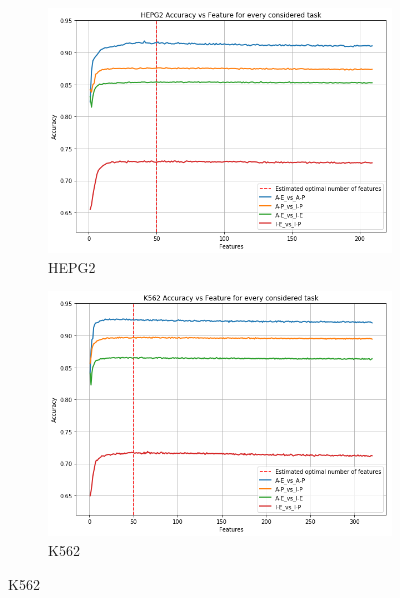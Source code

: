 \begin{figure}[!htb]
    \begin{subfigure}[b]{0.45\textwidth}
        \includegraphics[width=\textwidth]{images/features_plots_accuracy/HEPG2_n_features.png}
        \caption{HEPG2}
        \label{fig:HEPG2_n_feat}
    \end{subfigure}
    \begin{subfigure}[b]{0.48\textwidth}
        \includegraphics[width=\textwidth]{images/features_plots_accuracy/K562_n_features.png}
        \caption{K562}
        \label{fig:K562_n_feat}
    \end{subfigure}
    

\end{figure}
